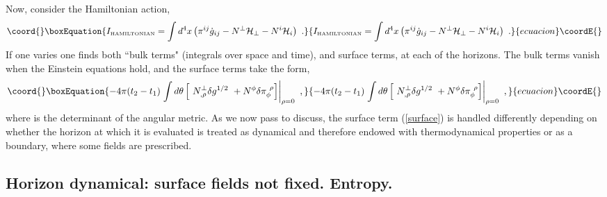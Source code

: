 \documentclass[a4paper,preprintnumbers,amsmath,amssymb]{revtex4}
\begin{document}
Now, consider the Hamiltonian action,
\begin{equation}\coord{}\boxEquation{
I_{\mbox{{\tiny HAMILTONIAN}}}=\int d^4 x \left( \pi^{ij}\dot{g}_{ij} - N^{\perp}{\cal H}_{\perp} - N^{i}{\cal
H}_{i} \right) \ .
\label{hamaction}
}{
I_{\mbox{{\tiny HAMILTONIAN}}}=\int d^4 x \left( \pi^{ij}\dot{g}_{ij} - N^{\perp}{\cal H}_{\perp} - N^{i}{\cal
H}_{i} \right) \ .
}{ecuacion}\coordE{}\end{equation}
If one varies \coordHE{} one finds both ``bulk terms" (integrals over space and time), and surface terms,
at each of the horizons. The bulk terms vanish when the Einstein equations hold, and the surface terms take the form\cite{BTZ},
\begin{equation}\coord{}\boxEquation{
-4\pi(t_2-t_1)\left.\int d\theta\left[ \ N^{\perp}_{,\rho} \delta g^{1/2}
 \ + N^{\phi}\delta\pi_{\phi}^{\ \rho} \right]\right|_{\rho=0} \ ,
\label{surface}
}{
-4\pi(t_2-t_1)\left.\int d\theta\left[ \ N^{\perp}_{,\rho} \delta g^{1/2}
 \ + N^{\phi}\delta\pi_{\phi}^{\ \rho} \right]\right|_{\rho=0} \ ,
}{ecuacion}\coordE{}\end{equation}
where \coordHE{} is the determinant of the angular metric.
As we now pass to discuss, the surface term (\ref{surface}) is handled differently depending on whether the horizon at which it is evaluated is treated as dynamical and
therefore endowed with thermodynamical properties or as a boundary, where some fields are prescribed.

\subsection*{Horizon dynamical: surface fields not fixed. Entropy.}
\end{document}
